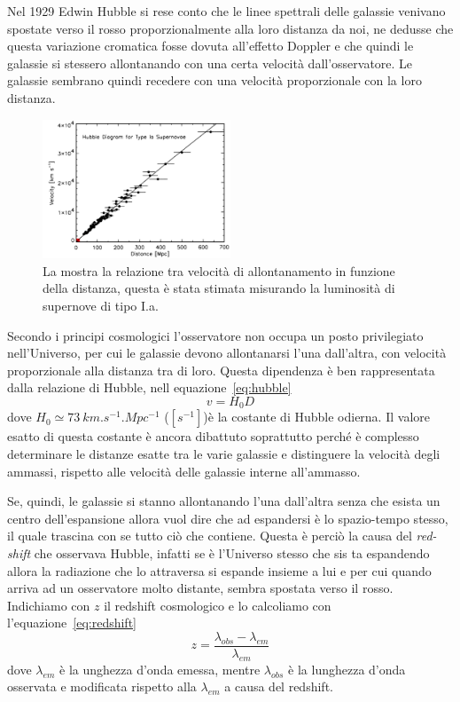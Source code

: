 Nel 1929 Edwin Hubble si rese conto che le linee spettrali delle galassie venivano spostate verso il rosso proporzionalmente alla loro distanza da noi, ne dedusse che questa variazione cromatica fosse dovuta all'effetto Doppler e che quindi le galassie si stessero allontanando con una certa velocità dall'osservatore. Le galassie sembrano quindi recedere con una velocità proporzionale con la loro distanza.

\begin{figure}
    \centering
    \includegraphics[width=0.5\textwidth]{immagini/redshift.png}
    \caption{La mostra la relazione tra velocità di allontanamento in funzione della distanza, questa è stata stimata misurando la luminosità di supernove di tipo I.a.}\label{fig:redshift}
\end{figure}

Secondo i principi cosmologici l'osservatore non occupa un posto privilegiato nell'Universo, per cui le galassie devono allontanarsi l'una dall'altra, con velocità proporzionale alla distanza tra di loro. Questa dipendenza è ben rappresentata dalla relazione di Hubble, nell equazione~\ref{eq:hubble}
\begin{equation}\label{eq:hubble}
    v = H_0 D
\end{equation}
dove $H_0 \simeq \SI{73}{km.s^{-1}.Mpc^{-1}}$ ($[s^{-1}]$)è la costante di Hubble odierna. Il valore esatto di questa costante è ancora dibattuto soprattutto perché è complesso determinare le distanze esatte tra le varie galassie e distinguere la velocità degli ammassi, rispetto alle velocità delle galassie interne all'ammasso.

Se, quindi, le galassie si stanno allontanando l'una dall'altra senza che esista un centro dell'espansione allora vuol dire che ad espandersi è lo spazio-tempo stesso, il quale trascina con se tutto ciò che contiene. Questa è perciò la causa del \textit{red-shift} che osservava Hubble, infatti se è l'Universo stesso che sis ta espandendo allora la radiazione che lo attraversa si espande insieme a lui e per cui quando arriva ad un osservatore molto distante, sembra spostata verso il rosso. Indichiamo con $z$ il redshift cosmologico e lo calcoliamo con l'equazione~\ref{eq:redshift}
\begin{equation}\label{eq:redshift}
    z = \frac{\lambda_{obs} - \lambda_{em}}{\lambda_{em}}
\end{equation}
dove $\lambda_{em}$ è la unghezza d'onda emessa, mentre $\lambda_{obs}$ è la lunghezza d'onda osservata e modificata rispetto alla $\lambda_{em}$ a causa del redshift.